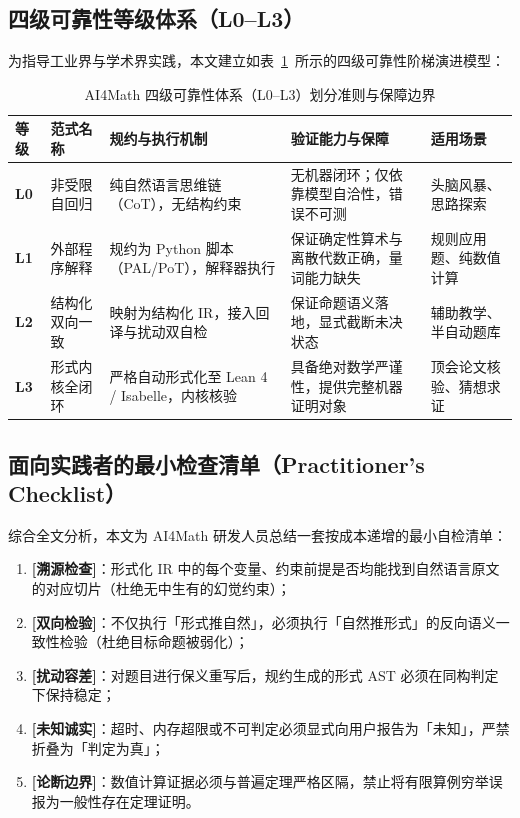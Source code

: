 ﻿\documentclass[UTF8,a4paper,11pt]{ctexart}
\theoremstyle{definition}
\begin{document}
\subsection{四级可靠性等级体系（L0--L3）}
为指导工业界与学术界实践，本文建立如表~\ref{tab:levels}~所示的四级可靠性阶梯演进模型：

\begin{table}[htbp]
\centering
\small
\caption{AI4Math 四级可靠性体系（L0--L3）划分准则与保障边界}
\label{tab:levels}
\begin{tabular}{p{1.2cm}p{2.8cm}p{3.8cm}p{4.0cm}p{1.8cm}}
\toprule
等级 & 范式名称 & 规约与执行机制 & 验证能力与保障 & 适用场景 \\
\midrule
\textbf{L0} & 非受限自回归 & 纯自然语言思维链（CoT），无结构约束 & 无机器闭环；仅依靠模型自洽性，错误不可测 & 头脑风暴、思路探索 \\
\textbf{L1} & 外部程序解释 & 规约为 Python 脚本（PAL/PoT），解释器执行 & 保证确定性算术与离散代数正确，量词能力缺失 & 规则应用题、纯数值计算 \\
\textbf{L2} & 结构化双向一致 & 映射为结构化 IR，接入回译与扰动双自检 & 保证命题语义落地，显式截断未决状态 & 辅助教学、半自动题库 \\
\textbf{L3} & 形式内核全闭环 & 严格自动形式化至 Lean 4 / Isabelle，内核核验 & 具备绝对数学严谨性，提供完整机器证明对象 & 顶会论文核验、猜想求证 \\
\bottomrule
\end{tabular}
\end{table}

\subsection{面向实践者的最小检查清单（Practitioner's Checklist）}
综合全文分析，本文为 AI4Math 研发人员总结一套按成本递增的最小自检清单：
\begin{enumerate}[leftmargin=1.8em,itemsep=2pt]
  \item \textbf{[溯源检查]}：形式化 IR 中的每个变量、约束前提是否均能找到自然语言原文的对应切片（杜绝无中生有的幻觉约束）；
  \item \textbf{[双向检验]}：不仅执行「形式推自然」，必须执行「自然推形式」的反向语义一致性检验（杜绝目标命题被弱化）；
  \item \textbf{[扰动容差]}：对题目进行保义重写后，规约生成的形式 AST 必须在同构判定下保持稳定；
  \item \textbf{[未知诚实]}：超时、内存超限或不可判定必须显式向用户报告为「未知」，严禁折叠为「判定为真」；
  \item \textbf{[论断边界]}：数值计算证据必须与普遍定理严格区隔，禁止将有限算例穷举误报为一般性存在定理证明。
\end{enumerate}
\end{document}
